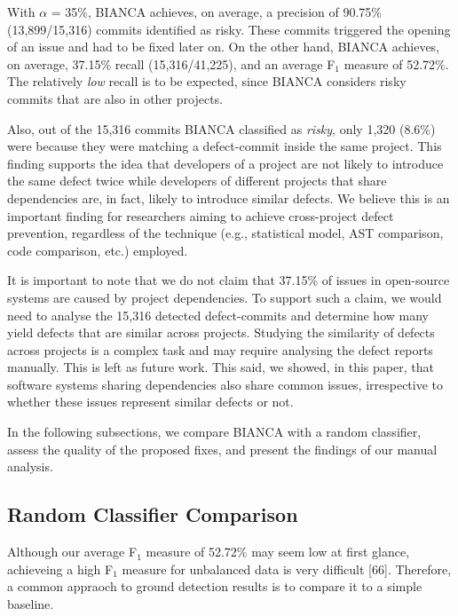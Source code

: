 \documentclass[conference]{IEEEtran}
\begin{document}
With $\alpha$ = 35\%, BIANCA achieves, on average, a precision of
90.75\% (13,899/15,316) commits identified as risky. These commits
triggered the opening of an issue and had to be fixed later on. On the
other hand, BIANCA achieves, on average, 37.15\% recall (15,316/41,225),
and an average F$_1$ measure of 52.72\%. The relatively \emph{low}
recall is to be expected, since BIANCA considers risky commits that are
also in other projects.

Also, out of the 15,316 commits BIANCA classified as \emph{risky}, only
1,320 (8.6\%) were because they were matching a defect-commit inside the
same project. This finding supports the idea that developers of a
project are not likely to introduce the same defect twice while
developers of different projects that share dependencies are, in fact,
likely to introduce similar defects. We believe this is an important
finding for researchers aiming to achieve cross-project defect
prevention, regardless of the technique (e.g., statistical model, AST
comparison, code comparison, etc.) employed.

It is important to note that we do not claim that 37.15\% of issues in
open-source systems are caused by project dependencies. To support such
a claim, we would need to analyse the 15,316 detected defect-commits and
determine how many yield defects that are similar across projects.
Studying the similarity of defects across projects is a complex task and
may require analysing the defect reports manually. This is left as
future work. This said, we showed, in this paper, that software systems
sharing dependencies also share common issues, irrespective to whether
these issues represent similar defects or not.

In the following subsections, we compare BIANCA with a random
classifier, assess the quality of the proposed fixes, and present the
findings of our manual analysis.

\subsection{Random Classifier
Comparison}\label{random-classifier-comparison}

Although our average F$_1$ measure of 52.72\% may seem low at first
glance, achieveing a high F$_1$ measure for unbalanced data is very
difficult {[}66{]}. Therefore, a common appraoch to ground detection
results is to compare it to a simple baseline.
\end{document}
